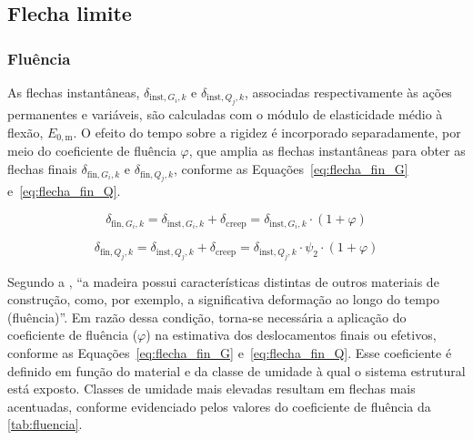 \subsection{Flecha limite}\label{sec:flecha_limite}

\subsubsection{Fluência}

As flechas instantâneas, $\delta_{\mathrm{inst},G_i,k}$ e $\delta_{\mathrm{inst},Q_j,k}$, associadas respectivamente às ações permanentes e variáveis, são calculadas com o módulo de elasticidade médio à flexão, $E_{0,\mathrm{m}}$. O efeito do tempo sobre a rigidez é incorporado separadamente, por meio do coeficiente de fluência $\varphi$, que amplia as flechas instantâneas para obter as flechas finais $\delta_{\mathrm{fin},G_i,k}$ e $\delta_{\mathrm{fin},Q_j,k}$, conforme as Equações~\eqref{eq:flecha_fin_G} e~\eqref{eq:flecha_fin_Q}.

\begin{equation}
\delta_{\mathrm{fin},G_i,k}
=
\delta_{\mathrm{inst},G_i,k}
+ \delta_{\mathrm{creep}}
=
\delta_{\mathrm{inst},G_i,k} \cdot (1 + \varphi)
\label{eq:flecha_fin_G}
\end{equation}

\begin{equation}
\delta_{\mathrm{fin},Q_j,k}
=
\delta_{\mathrm{inst},Q_j,k}
+ \delta_{\mathrm{creep}}
=
\delta_{\mathrm{inst},Q_j,k} \cdot \psi_{2} \cdot (1 + \varphi)
\label{eq:flecha_fin_Q}
\end{equation}

Segundo a \textcite{NBR7190-1:2022}, ``a madeira possui características distintas de outros materiais de construção, como, por exemplo, a significativa deformação ao longo do tempo (fluência)''.
Em razão dessa condição, torna-se necessária a aplicação do coeficiente de fluência ($\varphi$) na estimativa dos deslocamentos finais ou efetivos, conforme as Equações~\eqref{eq:flecha_fin_G} e~\eqref{eq:flecha_fin_Q}.
Esse coeficiente é definido em função do material e da classe de umidade à qual o sistema estrutural está exposto.
Classes de umidade mais elevadas resultam em flechas mais acentuadas, conforme evidenciado pelos valores do coeficiente de fluência da \ref{tab:fluencia}.

